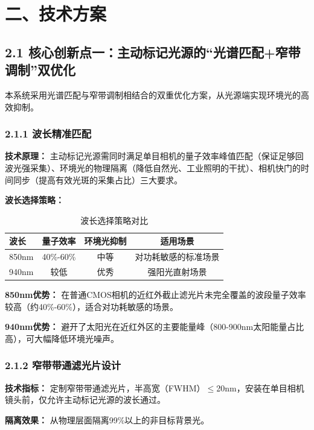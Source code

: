 \documentclass[12pt,a4paper]{article}
\begin{document}
\newpage

\section{二、技术方案}

\subsection{2.1 核心创新点一：主动标记光源的``光谱匹配+窄带调制''双优化}

本系统采用光谱匹配与窄带调制相结合的双重优化方案，从光源端实现环境光的高效抑制。

\subsubsection{2.1.1 波长精准匹配}

\textbf{技术原理：} 主动标记光源需同时满足单目相机的量子效率峰值匹配（保证足够回波光强采集）、环境光的物理隔离（降低自然光、工业照明的干扰）、相机快门的时间同步（提高有效光斑的采集占比）三大要求。

\textbf{波长选择策略：}

\begin{table}[H]
\centering
\caption{波长选择策略对比}
\begin{tabular}{lccc}
\toprule
波长 & 量子效率 & 环境光抑制 & 适用场景 \\
\midrule
850nm & 40\%-60\% & 中等 & 对功耗敏感的标准场景 \\
940nm & 较低 & 优秀 & 强阳光直射场景 \\
\bottomrule
\end{tabular}
\end{table}

\textbf{850nm优势：} 在普通CMOS相机的近红外截止滤光片未完全覆盖的波段量子效率较高（约40\%-60\%），适合对功耗敏感的场景。

\textbf{940nm优势：} 避开了太阳光在近红外区的主要能量峰（800-900nm太阳能量占比高），可大幅降低环境光噪声。

\subsubsection{2.1.2 窄带带通滤光片设计}

\textbf{技术指标：} 定制窄带带通滤光片，半高宽（FWHM）$\le$20nm，安装在单目相机镜头前，仅允许主动标记光源的波长通过。

\textbf{隔离效果：} 从物理层面隔离99\%以上的非目标背景光。
\end{document}
